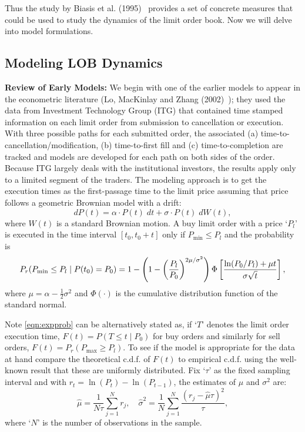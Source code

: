 Thus the study by Biasis et al. (1995)~\cite{spalt} provides a set of concrete measures that could be used to study the dynamics of the limit order book. Now we will delve into model formulations. 


\subsection{Modeling LOB Dynamics}


\noindent\textbf{Review of Early Models:} We begin with one of the earlier models to appear in the econometric literature (Lo, MacKinlay and Zhang (2002)~\cite{maczhang}); they used the data from Investment Technology Group (ITG) that contained time stamped information on each limit order from submission to cancellation or execution. With three possible paths for each submitted order, the associated (a) time-to-cancellation/modification, (b) time-to-first fill and (c) time-to-completion are tracked and models are developed for each path on both sides of the order. Because ITG largely deals with the institutional investors, the results apply only to a limited segment of the traders. The modeling approach is to get the execution times as the first-passage time to the limit price assuming that price follows a geometric Brownian model with a drift:
	\begin{equation}\label{eqn:dp(t)}
	dP(t)= \alpha \cdot P(t) \; dt + \sigma \cdot P(t) \; dW(t),
	\end{equation}
where $W(t)$ is a standard Brownian motion. A buy limit order with a price `$P_l$' is executed in the time interval $[t_0,t_0+t]$ only if $P_{\text{min}} \leq P_l$ and the probability is
	\begin{equation}\label{eqn:expprob}
	\small P_r(P_{\text{min}} \leq P_l \;|\; P(t_0)=P_0)= 1- \left(1 - \left(\dfrac{P_l}{P_0}\right)^{2\mu/\sigma^2}\right) \Phi\left[\dfrac{\ln(P_0/P_l) + \mu t}{\sigma \sqrt{t}}\right],
	\end{equation}
where $\mu=\alpha - \frac{1}{2} \sigma^2$ and $\Phi(\cdot)$ is the cumulative distribution function of the standard normal. 


Note \eqref{eqn:expprob} can be alternatively stated as, if `$T$' denotes the limit order execution time, $F(t)=P(T \leq t \;|\; P_0)$ for buy orders and similarly for sell orders, $F(t)=P_r(P_{\text{max}} \geq P_l)$. To see if the model is appropriate for the data at hand compare the theoretical c.d.f. of $F(t)$ to empirical c.d.f. using the well-known result that these are uniformly distributed. Fix `$\tau$' as the fixed sampling interval and with $r_t=\ln(P_t)-\ln(P_{t-1})$, the estimates of $\mu$ and $\sigma^2$ are:
	\begin{equation}\label{eqn:sampleestm}
	\hat{\mu}= \dfrac{1}{N\tau} \sum_{j=1}^N r_j, \quad \hat{\sigma}^2= \dfrac{1}{N} \sum_{j=1}^N \dfrac{(r_j - \hat{\mu} \tau)^2}{\tau},
	\end{equation}
where `$N$' is the number of observations in the sample. 


